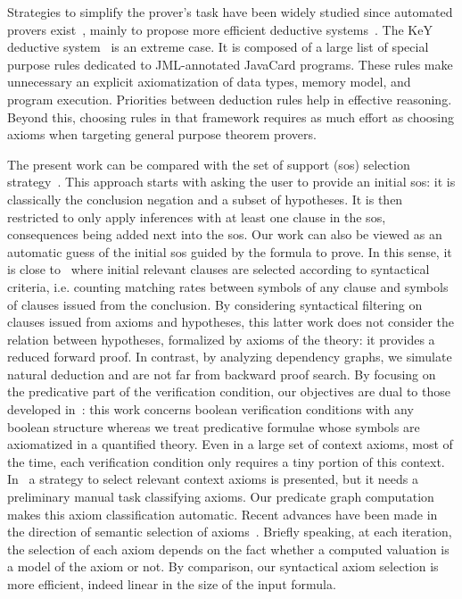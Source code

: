 \documentclass{acm_proc_article-sp}
\theoremstyle{nonumberplain}
\begin{document}
Strategies to simplify the prover's task have been widely studied since
automated provers exist~\cite{WosRC65}, mainly to propose more
efficient deductive systems~\cite{WosRC65,WosP99,Wos01}. The KeY
deductive system~\cite{KeYBook2007} is an extreme case. It is composed
of a large list of special purpose rules dedicated to
JML-annotated JavaCard programs. These rules make unnecessary an
explicit axiomatization of  data types, memory model, and program
execution. Priorities between deduction rules help in effective 
reasoning. Beyond this, choosing rules in that framework requires
as much effort as choosing axioms when targeting general purpose
theorem provers. 

The present work can be compared with the set of support (sos)
selection strategy~\cite{WosRC65,PlaistedY03}. This approach starts
with asking the user to provide an initial sos: it is classically the
 conclusion negation and a subset of hypotheses. It is then restricted
 to only apply inferences with at least one clause in the sos,
consequences being added next into the sos. Our work can also be viewed
as an automatic  guess of the initial sos guided by the formula to
prove. In this sense, it is close to~\cite{MP06} where initial relevant
clauses are selected according to syntactical criteria, i.e. counting
matching rates between symbols of any clause and symbols of clauses
issued from the conclusion. By considering syntactical filtering on
clauses issued from axioms and hypotheses, this latter work does not
consider the relation between hypotheses, formalized by axioms of  the
theory: it  provides a reduced forward proof. In contrast, by analyzing
dependency graphs, we simulate natural deduction and are not far from
backward proof search. By focusing on the predicative part of the
verification condition, our objectives are dual to those developed
in~\cite{Gri00}: this work concerns boolean verification conditions
with any boolean structure whereas we treat predicative formulae whose
symbols are axiomatized in a quantified theory. Even in a large set of
context axioms, most of the time, each verification condition only
requires a tiny portion of this context. In~\cite{RF97theorem,DR06} a
strategy to select relevant context axioms is presented, but it needs a
preliminary manual task classifying axioms. Our predicate graph
computation makes this  axiom classification automatic. Recent advances
have been made in the direction of semantic selection of
axioms~\cite{SutcliffeP07,pudlak07}. Briefly speaking, at each
iteration, the selection of each axiom depends on the fact whether a
computed valuation is a model of the axiom or not. By comparison, our
syntactical axiom selection is more efficient, indeed linear in the
size of the input formula.
\end{document}
